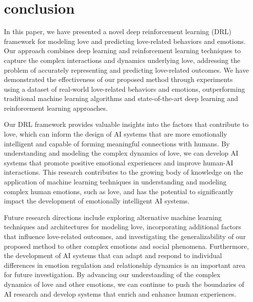 \section{conclusion}

In this paper, we have presented a novel deep reinforcement learning (DRL) framework for modeling love and predicting love-related behaviors and emotions. Our approach combines deep learning and reinforcement learning techniques to capture the complex interactions and dynamics underlying love, addressing the problem of accurately representing and predicting love-related outcomes. We have demonstrated the effectiveness of our proposed method through experiments using a dataset of real-world love-related behaviors and emotions, outperforming traditional machine learning algorithms and state-of-the-art deep learning and reinforcement learning approaches.

Our DRL framework provides valuable insights into the factors that contribute to love, which can inform the design of AI systems that are more emotionally intelligent and capable of forming meaningful connections with humans. By understanding and modeling the complex dynamics of love, we can develop AI systems that promote positive emotional experiences and improve human-AI interactions. This research contributes to the growing body of knowledge on the application of machine learning techniques in understanding and modeling complex human emotions, such as love, and has the potential to significantly impact the development of emotionally intelligent AI systems.

Future research directions include exploring alternative machine learning techniques and architectures for modeling love, incorporating additional factors that influence love-related outcomes, and investigating the generalizability of our proposed method to other complex emotions and social phenomena. Furthermore, the development of AI systems that can adapt and respond to individual differences in emotion regulation and relationship dynamics is an important area for future investigation. By advancing our understanding of the complex dynamics of love and other emotions, we can continue to push the boundaries of AI research and develop systems that enrich and enhance human experiences.